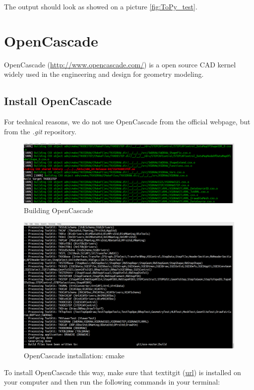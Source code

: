 \documentclass[11pt,a4paper,article,bibtotoc,idxtotoc,headsepline,footsepline,footexclude,DIV13,oneside]{scrbook}
\begin{document}
The output should look as showed on a picture \ref{fig:ToPy_test}.


\chapter{OpenCascade}
\label{OpenCascade}
OpenCascade (\href{http://www.opencascade.com/}{http://www.opencascade.com/}) is a open source CAD kernel widely used in the engineering and design for geometry modeling.
\section{Install OpenCascade}
For technical reasons, we do not use OpenCascade from the official webpage, but from the \textit{.git} repository. 
\begin{figure}
\centering
\includegraphics[scale=0.3]{img/OC_Build5_cut.png}
\caption{Building OpenCascade}
\label{fig:OC_build}
\end{figure}
\begin{figure}
\centering
\includegraphics[scale=0.3]{img/OC_CMake2.png}
\caption{OpenCascade installation: cmake}
\label{fig:OC_cmake}
\end{figure}
To install OpenCascade this way, make sure that textit{git} (\href{https://git-scm.com/}{url}) is installed on your computer and then run the following commands in your terminal:
\end{document}

